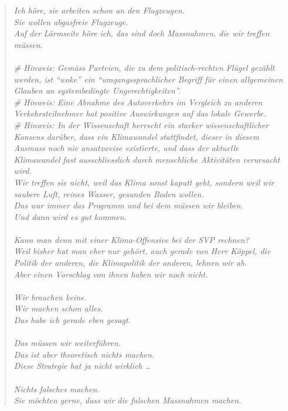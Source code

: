 \documentclass[a4paper,11pt]{report}
\newenvironment{itquote}
	{\begin{quote}\itshape}
	{\end{quote}\ignorespacesafterend}
\begin{document}
\begin{itquote}
				Ich höre, sie arbeiten schon an den Flugzeugen.\\
				Sie wollen abgasfreie Flugzeuge.\\
				Auf der Lärmseite höre ich, das sind doch Massnahmen, die wir treffen müssen.\\
				\\
				  \# Hinweis: Gemäss Parteien, die zu dem politisch-rechten Flügel gezählt werden, ist ``woke'' ein ``umgangssprachlicher Begriff für einen allgemeinen Glauben an systembedingte Ungerechtigkeiten''.\\
				  \# Hinweis: Eine Abnahme des Autoverkehrs im Vergleich zu anderen Verkehrsteilnehmer hat positive Auswirkungen auf das lokale Gewerbe.\\
				  \# Hinweis: In der Wissenschaft herrscht ein starker wissenschaftlicher Konsens darüber, dass ein Klimawandel stattfindet, dieser in diesem Ausmass noch nie ansatzweise existierte, und dass der aktuelle Klimawandel fast ausschliesslich durch menschliche Aktivitäten verursacht wird.\\
				Wir treffen sie nicht, weil das Klima sonst kaputt geht, sondern weil wir saubere Luft, reines Wasser, gesunden Boden wollen.\\
				Das war immer das Programm und bei dem müssen wir bleiben.\\
				Und dann wird es gut kommen.\\
				\\
				Kann man denn mit einer Klima-Offensive bei der SVP rechnen?\\
				Weil bisher hat man eher nur gehört, auch gerade von Herr Köppel, die Politik der anderen, die Klimapolitik der anderen, lehnen wir ab.\\
				Aber einen Vorschlag von ihnen haben wir noch nicht.\\
				\\
				Wir brauchen keine.\\
				Wir machen schon alles.\\
				Das habe ich gerade eben gesagt.\\
				\\
				Das müssen wir weiterführen.\\
				Das ist aber theoretisch nichts machen.\\
				Diese Strategie hat ja nicht wirklich \ldots\\
				\\
				Nichts falsches machen.\\
				Sie möchten gerne, dass wir die falschen Massnahmen machen.\\

\end{itquote}
\end{document}
